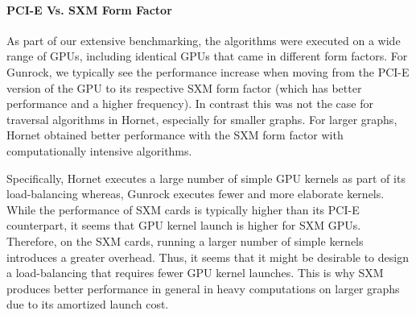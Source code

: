 \paragraph{PCI-E Vs. SXM Form Factor}
As part of our extensive benchmarking, the algorithms were executed on a wide range of GPUs, including identical GPUs that came in different form factors. For Gunrock, we typically see the performance increase when moving from the PCI-E version of the GPU to its respective SXM form factor (which has better performance and a higher frequency). In contrast this was not the case for traversal algorithms in Hornet, especially for smaller graphs. For larger graphs, Hornet obtained  better performance with the SXM form factor with computationally intensive algorithms.

Specifically, Hornet executes a large number of simple GPU kernels as part of its load-balancing whereas, Gunrock executes fewer and more elaborate kernels. While the performance of SXM cards is typically higher than its PCI-E counterpart, it seems that GPU kernel launch is higher for SXM GPUs. Therefore, on the SXM cards, running a larger number of simple kernels introduces a greater overhead. Thus, it seems that it might be desirable to design a load-balancing that requires fewer GPU kernel launches. This is why SXM produces better performance in general in heavy computations on larger graphs due to its amortized launch cost.